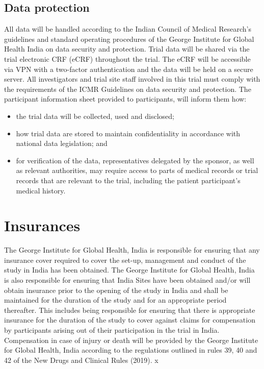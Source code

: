 \documentclass[
]{scrartcl}
\providecommand{\tightlist}{%
  \setlength{\itemsep}{0pt}\setlength{\parskip}{0pt}}\usepackage{longtable,booktabs,array}
\begin{document}
\hypertarget{data-protection}{%
\subsection{Data protection}\label{data-protection}}

All data will be handled according to the Indian Council of Medical
Research's guidelines and standard operating procedures of the George
Institute for Global Health India on data security and protection. Trial
data will be shared via the trial electronic CRF (eCRF) throughout the
trial. The eCRF will be accessible via VPN with a two-factor
authentication and the data will be held on a secure server. All
investigators and trial site staff involved in this trial must comply
with the requirements of the ICMR Guidelines on data security and
protection. The participant information sheet provided to participants,
will inform them how:

\begin{itemize}
\tightlist
\item
  the trial data will be collected, used and disclosed;
\item
  how trial data are stored to maintain confidentiality in accordance
  with national data legislation; and
\item
  for verification of the data, representatives delegated by the
  sponsor, as well as relevant authorities, may require access to parts
  of medical records or trial records that are relevant to the trial,
  including the patient participant's medical history.
\end{itemize}

\hypertarget{insurances}{%
\section{Insurances}\label{insurances}}

The George Institute for Global Health, India is responsible for
ensuring that any insurance cover required to cover the set-up,
management and conduct of the study in India has been obtained. The
George Institute for Global Health, India is also responsible for
ensuring that India Sites have been obtained and/or will obtain
insurance prior to the opening of the study in India and shall be
maintained for the duration of the study and for an appropriate period
thereafter. This includes being responsible for ensuring that there is
appropriate insurance for the duration of the study to cover against
claims for compensation by participants arising out of their
participation in the trial in India. Compensation in case of injury or
death will be provided by the George Institute for Global Health, India
according to the regulations outlined in rules 39, 40 and 42 of the New
Drugs and Clinical Rules (2019). x
\end{document}
